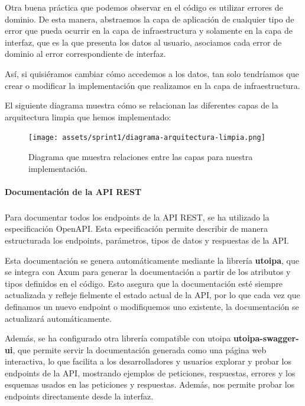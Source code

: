 Otra buena práctica que podemos observar en el código es utilizar errores de dominio. De esta manera, abstraemos la capa de aplicación de cualquier tipo de error que pueda ocurrir en la capa de infraestructura y solamente en la capa de interfaz, que es la que presenta los datos al usuario, asociamos cada error de dominio al error correspondiente de interfaz.

Así, si quisiéramos cambiar cómo accedemos a los datos, tan solo tendríamos que crear o modificar la implementación que realizamos en la capa de infraestructura.

El siguiente diagrama muestra cómo se relacionan las diferentes capas de la arquitectura limpia que hemos implementado:
\begin{figure}[H]
    \begin{center}
        \texttt{[image: assets/sprint1/diagrama-arquitectura-limpia.png]}
    \end{center}
    \caption{Diagrama que muestra relaciones entre las capas para nuestra implementación.}\label{fig:diagrama-arquitectura-limpia-sprint1}
\end{figure}

\paragraph{Documentación de la API REST}
\subparagraph{}

Para documentar todos los endpoints de la API REST, se ha utilizado la especificación OpenAPI. Esta especificación permite describir de manera estructurada los endpoints, parámetros, tipos de datos y respuestas de la API.

Esta documentación se genera automáticamente mediante la librería \textbf{utoipa}, que se integra con Axum para generar la documentación a partir de los atributos y tipos definidos en el código. 
Esto asegura que la documentación esté siempre actualizada y refleje fielmente el estado actual de la API, por lo que cada vez que definamos un nuevo endpoint o modifiquemos uno existente, la documentación se actualizará automáticamente.

Además, se ha configurado otra librería compatible con utoipa \textbf{utoipa-swagger-ui}, que permite servir la documentación generada como una página web interactiva, lo que facilita a los desarrolladores y usuarios explorar y probar los endpoints de la API, mostrando ejemplos de peticiones, respuestas, errores y los esquemas usados en las peticiones y respuestas.
Además, nos permite probar los endpoints directamente desde la interfaz.

